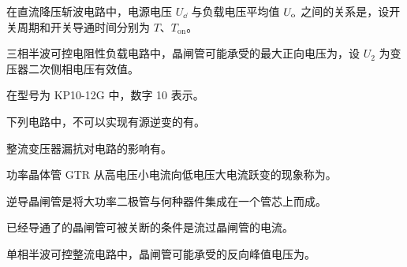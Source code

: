 \documentclass[电力电子]{subfiles}
\begin{document}
\begin{ti}
	在直流降压斩波电路中，电源电压 $U_{\dd}$ 与负载电压平均值 $U_{\mathrm{o}}$ 之间的关系是，设开关周期和开关导通时间分别为 $T$、$T_{\mathrm{on}}$。
\end{ti}

\begin{ti}
	三相半波可控电阻性负载电路中，晶闸管可能承受的最大正向电压为，设 $U_{2}$ 为变压器二次侧相电压有效值。
\end{ti}

\begin{ti}
	在型号为 KP10-12G 中，数字 10 表示。
\end{ti}

\begin{ti}
	下列电路中，不可以实现有源逆变的有。
\end{ti}

\begin{ti}
	整流变压器漏抗对电路的影响有。
\end{ti}

\begin{ti}
	功率晶体管 GTR 从高电压小电流向低电压大电流跃变的现象称为。
\end{ti}

\begin{ti}
	逆导晶闸管是将大功率二极管与何种器件集成在一个管芯上而成。
\end{ti}

\begin{ti}
	已经导通了的晶闸管可被关断的条件是流过晶闸管的电流。
\end{ti}

\begin{ti}
	单相半波可控整流电路中，晶闸管可能承受的反向峰值电压为。
\end{ti}
\end{document}
